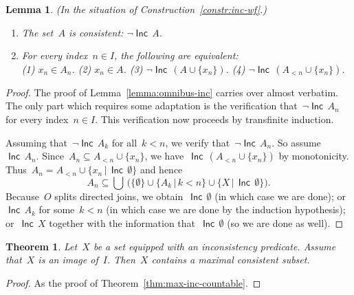 \documentclass[com,11pt,crcready]{iosart2x}
\theoremstyle{definition}
\theoremstyle{plain}
\newtheorem{lemma}[definition]{Lemma}
\newtheorem{theorem}[definition]{Theorem}
\theoremstyle{remark}
\newcommand{\Incbare}{\mathsf{Inc}}
\newcommand{\Inc}[1]{\operatorname{\Incbare}\,#1}
\newcommand{\?}{\,{:}\,}
\renewcommand{\_}{\mathpunct{.}\,}
\begin{document}
\begin{lemma}\label{lemma:omnibus-inc-wf}(In the situation of
Construction~\ref{constr:inc-wf}.)
\begin{enumerate}
\item[(a)] The set~$A$ is consistent: $\neg \Inc{A}$.
\item[(b)] For every index~$n \in I$, the following are equivalent: \\
(1) $x_n \in A_n$. \quad
(2) $x_n \in A$. \quad
(3) $\neg \Inc{(A\cup\{x_n\})}$. \quad
(4) $\neg \Inc{(A_{<n} \cup \{x_n\})}$.
\end{enumerate}\end{lemma}

\begin{proof}The proof of Lemma~\ref{lemma:omnibus-inc} carries over almost
verbatim. The only part which requires some adaptation is the verification
that~$\neg \Inc{A_n}$ for every index~$n \in I$. This verification now proceeds by
transfinite induction.

Assuming that~$\neg \Inc{A_k}$ for all~$k < n$, we verify that~$\neg \Inc{A_n}$. So
assume~$\Inc{A_n}$. Since~$A_n \subseteq A_{<n} \cup \{x_n\}$, we have~$\Inc{(A_{<n}
\cup \{x_n\})}$ by monotonicity. Thus~$A_n = A_{<n} \cup
\{x_n\,|\,\Inc{\emptyset}\}$ and hence
\[ A_n \subseteq \bigcup\,\bigl(\{ \emptyset \} \cup \{ A_k \,|\, k < n \} \cup
\{ X \,|\, \Inc{\emptyset} \}\bigr). \]
Because~$O$ splits directed joins, we obtain~$\Inc{\emptyset}$ (in which case we
are done); or~$\Inc{A_k}$ for some~$k < n$ (in which case we are done by the
induction hypothesis); or~$\Inc{X}$ together with the information
that~$\Inc{\emptyset}$ (so we are done as well).
\end{proof}

\begin{theorem}\label{thm:max-inc-wf}Let~$X$ be a set equipped
with an inconsistency predicate. Assume that~$X$ is an image of~$I$.
Then~$X$ contains a maximal consistent subset.\end{theorem}

\begin{proof}As the proof of Theorem~\ref{thm:max-inc-countable}.\end{proof}


\nocite{label}

\end{document}
